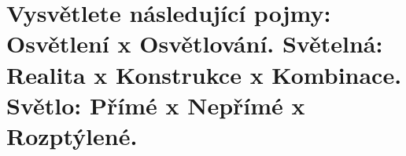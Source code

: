 \section{Vysvětlete následující pojmy: Osvětlení x Osvětlování. Světelná: Realita x Konstrukce x Kombinace. Světlo: 
Přímé x Nepřímé x Rozptýlené.}